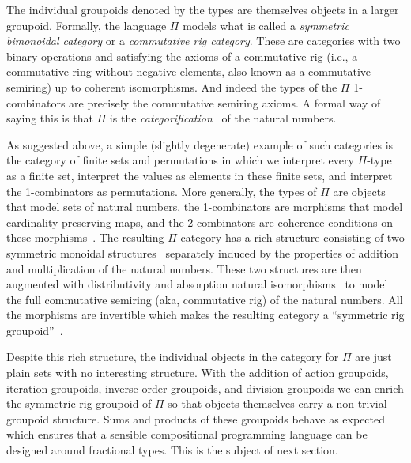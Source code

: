 The individual groupoids denoted by the types are themselves objects
in a larger groupoid. Formally, the language $\Pi$ models what is
called a \emph{symmetric bimonoidal category} or a \emph{commutative
  rig category}. These are categories with two binary operations and
satisfying the axioms of a commutative rig (i.e., a commutative ring
without negative elements, also known as a commutative semiring) up to
coherent isomorphisms. And indeed the types of the $\Pi$ 1-combinators
are precisely the commutative semiring axioms. A formal way of saying
this is that $\Pi$ is the \emph{categorification}~\cite{math/9802029}
of the natural numbers.

As suggested above, a simple (slightly degenerate) example of such
categories is the category of finite sets and permutations in which we
interpret every $\Pi$-type as a finite set, interpret the values as
elements in these finite sets, and interpret the 1-combinators as
permutations. More generally, the types of $\Pi$ are objects that
model sets of natural numbers, the 1-combinators are morphisms that
model cardinality-preserving maps, and the 2-combinators are coherence
conditions on these morphisms~\cite{Carette2016}. The resulting
$\Pi$-category has a rich structure consisting of two symmetric
monoidal structures~\cite{nla.cat-vn1051288} separately induced by the
properties of addition and multiplication of the natural
numbers. These two structures are then augmented with distributivity
and absorption natural isomorphisms~\cite{laplaza} to model the full
commutative semiring (aka, commutative rig) of the natural
numbers. All the morphisms are invertible which makes the resulting
category a ``symmetric rig groupoid''~\cite{nlabrig}.

Despite this rich structure, the individual objects in the category
for $\Pi$ are just plain sets with no interesting structure. With the
addition of action groupoids, iteration groupoids, inverse order
groupoids, and division groupoids we can enrich the symmetric rig
groupoid of $\Pi$ so that objects themselves carry a non-trivial
groupoid structure. Sums and products of these groupoids behave as
expected which ensures that a sensible compositional programming
language can be designed around fractional types. This is the subject
of next section.



